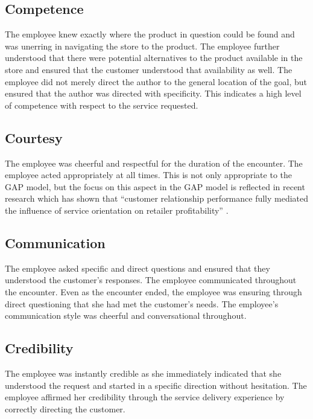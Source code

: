 \documentclass[man]{apa7}
\begin{document}
\subsection{Competence}
\label{sec:org36e88dd}

The employee knew exactly where the product in question could be found and was unerring in navigating the store to the product. The employee further understood that there were potential alternatives to the product available in the store and ensured that the customer understood that availability as well. The employee did not merely direct the author to the general location of the goal, but ensured that the author was directed with specificity. This indicates a high level of competence with respect to the service requested.

\subsection{Courtesy}
\label{sec:org9897b7d}

The employee was cheerful and respectful for the duration of the encounter. The employee acted appropriately at all times. This is not only appropriate to the GAP model, but the focus on this aspect in the GAP model is reflected in recent research which has shown that ``customer relationship performance fully mediated the influence of service orientation on retailer profitability'' \parencite{briggsLinkingOrganizationalService2020}.

\subsection{Communication}
\label{sec:orgc04d247}

The employee asked specific and direct questions and ensured that they understood the customer's responses. The employee communicated throughout the encounter. Even as the encounter ended, the employee was ensuring through direct questioning that she had met the customer's needs. The employee's communication style was cheerful and conversational throughout.

\subsection{Credibility}
\label{sec:orga74026c}

The employee was instantly credible as she immediately indicated that she understood the request and started in a specific direction without hesitation. The employee affirmed her credibility through the service delivery experience by correctly directing the customer.
\end{document}
